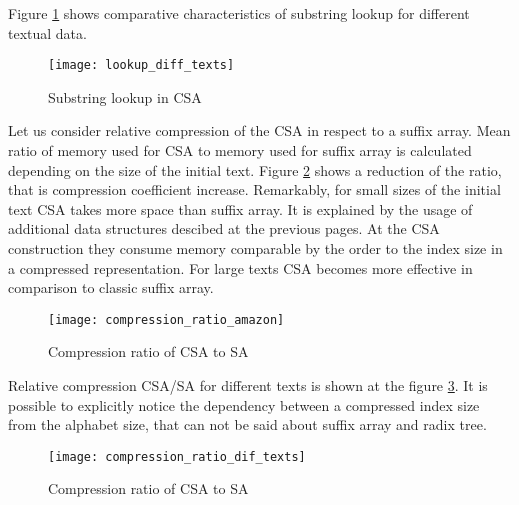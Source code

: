 Figure \ref{fig:CSA_Lookup_diff_texts} shows comparative characteristics of substring lookup
for different textual data.

\begin{figure}[h!]
    \centering
    \texttt{[image: lookup\_diff\_texts]}
    \caption{Substring lookup in CSA}
    \label{fig:CSA_Lookup_diff_texts}
\end{figure}

Let us consider relative compression of the CSA in respect to a suffix array.
Mean ratio of memory used for CSA to memory used for suffix array is calculated
depending on the size of the initial text. Figure \ref{fig:CSA_compression_ratio_amazon} shows
a reduction of the ratio, that is compression coefficient increase.
Remarkably, for small sizes of the initial text CSA takes more space than suffix array.
It is explained by the usage of additional data structures descibed at the previous pages.
At the CSA construction they consume memory comparable by the order to the index size
in a compressed representation. For large texts CSA becomes more effective in comparison to
classic suffix array.

\begin{figure}[h!]
    \centering
    \texttt{[image: compression\_ratio\_amazon]}
    \caption{Compression ratio of CSA to SA}
    \label{fig:CSA_compression_ratio_amazon}
\end{figure}

Relative compression CSA/SA for different texts is shown at the figure \ref{fig:CSA_compression_ratio_dif_texts}.
It is possible to explicitly notice the dependency between a compressed index size from the alphabet size,
that can not be said about suffix array and radix tree.

\begin{figure}[h!]
    \centering
    \texttt{[image: compression\_ratio\_dif\_texts]}
    \caption{Compression ratio of CSA to SA}
    \label{fig:CSA_compression_ratio_dif_texts}
\end{figure}
